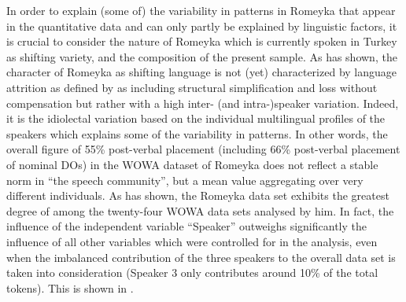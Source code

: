 \documentclass[output=paper,colorlinks,citecolor=brown]{langscibook}
\begin{document}
In order to explain (some of) the variability in  patterns in Romeyka that appear in the quantitative data and can only partly be explained by linguistic factors, it is crucial to consider the nature of Romeyka which is currently spoken in Turkey as shifting variety, and the composition of the present sample. As \citet{schreibergrammar2022} has shown, the character of Romeyka as shifting language is not (yet) characterized by language attrition as defined by \citet[12]{thomason2001language} as including structural simplification and loss without compensation but rather with a high inter- (and intra-)speaker variation. Indeed, it is the idiolectal variation based on the individual multilingual profiles of the speakers which explains some of the variability in  patterns. In other words, the overall figure of 55\% post-verbal placement (including 66\% post-verbal placement of nominal DOs) in the WOWA dataset of Romeyka does not reflect a stable norm in ``the speech community'', but a mean value aggregating over very different individuals. As \citet{craevschi_historical_2022} has shown, the Romeyka data set exhibits the greatest degree of  among the twenty-four WOWA data sets analysed by him. In fact, the influence of the independent variable ``Speaker'' outweighs significantly the influence of all other variables which were controlled for in the analysis, even when the imbalanced contribution of the three speakers to the overall data set is taken into consideration (Speaker 3 only contributes around 10\% of the total tokens). This is shown in .

\begin{table}

    \caption{Overview of speakers and their corresponding texts in the WOWA dataset}
    \label{Romeyka:tab:1}
\end{table}
\end{document}
